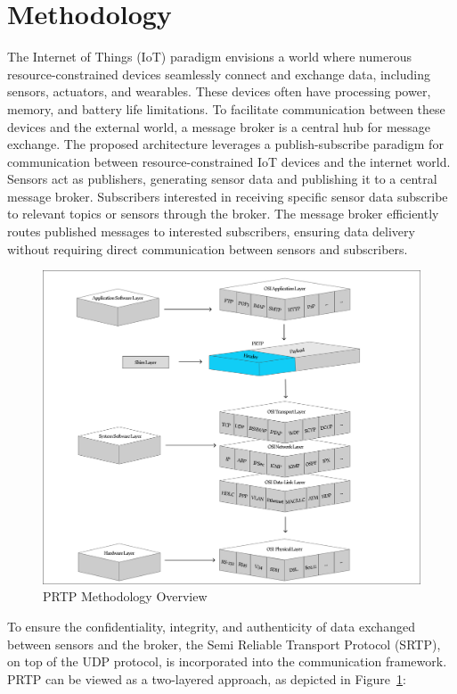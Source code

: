 \documentclass[lettersize,journal]{IEEEtran}
\begin{document}
\section{Methodology}
The Internet of Things (IoT) paradigm envisions a world where numerous resource-constrained devices seamlessly connect and exchange data, including sensors, actuators, and wearables. These devices often have processing power, memory, and battery life limitations. To facilitate communication between these devices and the external world, a message broker is a central hub for message exchange. The proposed architecture leverages a publish-subscribe paradigm for communication between resource-constrained IoT devices and the internet world. Sensors act as publishers, generating sensor data and publishing it to a central message broker. Subscribers interested in receiving specific sensor data subscribe to relevant topics or sensors through the broker. The message broker efficiently routes published messages to interested subscribers, ensuring data delivery without requiring direct communication between sensors and subscribers.

\begin{figure}[htbp]
    \centering
    \includegraphics[width=0.8\columnwidth]{Figure/methodology.png}
    \caption{PRTP Methodology Overview}
    \label{fig:methodology}
\end{figure}

To ensure the confidentiality, integrity, and authenticity of data exchanged between sensors and the broker, the Semi Reliable Transport Protocol (SRTP), on top of the UDP protocol, is incorporated into the communication framework. PRTP can be viewed as a two-layered approach, as depicted in Figure~\ref{fig:methodology}:
\end{document}
